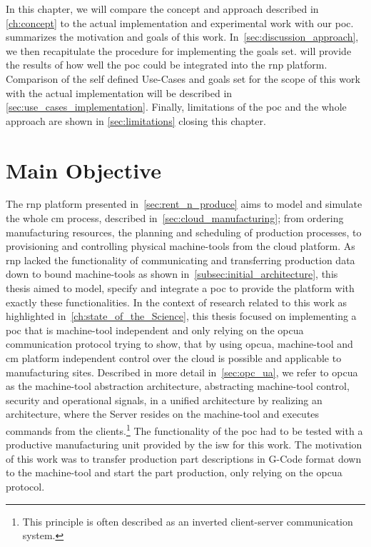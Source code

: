 \documentclass[
a4paper,
twoside,
headsepline,
cleardoublepage=empty,
parskip=half,
draft=false
]{scrbook}
\begin{document}
		In this chapter, we will compare the concept and approach described in \cref{ch:concept} to the actual implementation and experimental work with our \gls{poc}.
		 summarizes the motivation and goals of this work.
		In~\cref{sec:discussion_approach}, we then recapitulate the procedure for implementing the goals set. 
		 will provide the results of how well the \gls{poc} could be integrated into the \gls{rnp} platform. Comparison of the self defined Use-Cases and goals set for the scope of this work with the actual implementation will be described in \cref{sec:use_cases_implementation}. Finally, limitations of the \gls{poc} and the whole approach are shown in \cref{sec:limitations} closing this chapter.
		
		\section{Main Objective}\label{sec:main_objective}
		
			The \gls{rnp} platform presented in~\cref{sec:rent_n_produce} aims to model and simulate the whole \gls{cm} process, described in~\cref{sec:cloud_manufacturing}; from ordering manufacturing resources, the planning and scheduling of production processes, to provisioning and controlling physical machine-tools from the cloud platform. As \gls{rnp} lacked the functionality of communicating and transferring production data down to bound machine-tools as shown in~\cref{subsec:initial_architecture}, this thesis aimed to model, specify and integrate a \gls{poc} to provide the platform with exactly these functionalities. In the context of research related to this work as highlighted in~\cref{ch:state_of_the_Science}, this thesis focused on implementing a \gls{poc} that is machine-tool independent and only relying on the \gls{opcua} communication protocol trying to show, that by using \gls{opcua}, machine-tool and \gls{cm} platform independent control over the cloud is possible and applicable to manufacturing sites. 
			Described in more detail in~\cref{sec:opc_ua}, we refer to \gls{opcua} as the machine-tool abstraction architecture, abstracting machine-tool control, security and operational signals, in a unified architecture by realizing an architecture, where the Server resides on the machine-tool and executes commands from the clients.\footnote{This principle is often described as an inverted client-server communication system.}
			The functionality of the \gls{poc} had to be tested with a productive manufacturing unit provided by the \gls{isw} for this work.
			The motivation of this work was to transfer production part descriptions in G-Code format down to the machine-tool and start the part production, only relying on the \gls{opcua} protocol.
			
\end{document}
